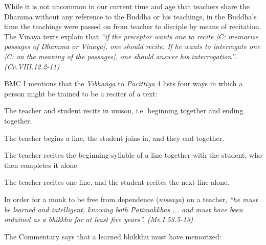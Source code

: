 While it is not uncommon in our current time and age that teachers share the Dhamma without any reference to the Buddha or his teachings, in the Buddha's time the teachings were passed on from teacher to disciple by means of recitation. The Vinaya texts explain that \textit{``if the preceptor wants one to recite [C: memorize passages of Dhamma or Vinaya], one should recite. If he wants to interrogate one [C: on the meaning of the passages], one should answer his interrogation''. (Cv.VIII.12.2-11)}

BMC I mentions that the \textit{Vibhaṅga} to \textit{Pācittiya} 4 lists four ways in which a person might be trained to be a reciter of a text:


\ifbfiveversion
\begin{packedenumerate}
  \item The teacher and student recite in unison, i.e. beginning together and ending together.
  \item The teacher begins a line, the student joins in, and they end together.
  \item The teacher recites the beginning syllable of a line together with the student, who then completes it alone.
  \item The teacher recites one line, and the student recites the next line alone.
\end{packedenumerate}
\else
\fi

In order for a monk to be free from dependence (\textit{nissaya}) on a teacher, \textit{``he must be learned and intelligent, knowing both Pāṭimokkhas ... and must have been ordained as a bhikkhu for at least five years''. (Mv.I.53.5-13)}

The Commentary says that a learned bhikkhu must have memorized:

